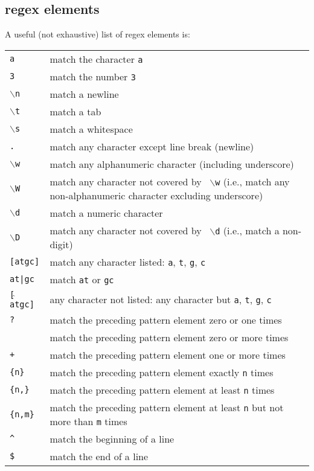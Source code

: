 \subsection {regex elements}

A useful (not exhaustive) list of regex elements is: 

\begin{tabular}{p{2cm} p{10cm}} 
 {\tt a} & match the character {\tt a}\\
 {\tt 3} & match the number {\tt 3}\\
 {\tt $\backslash$n} & match a newline\\
 {\tt $\backslash$t} & match a tab\\
 {\tt $\backslash$s} & match a whitespace\\
 {\tt .} & match any character except line break (newline)\\
 {\tt $\backslash$w} & match any alphanumeric character (including
underscore)\\
 {\tt $\backslash$W} & match any character not covered by {\tt 
 $\backslash$w} (i.e., match any non-alphanumeric character excluding 
 underscore)\\
 {\tt $\backslash$d} & match a numeric character\\
 {\tt $\backslash$D} & match any character not covered by {\tt 
 $\backslash$d} (i.e., match a non-digit)\\
 {\tt [atgc]} & match any character listed: {\tt a}, {\tt t}, {\tt g}, 
 {\tt c}\\
 {\tt at|gc} & match {\tt at} or {\tt gc}\\
 {\tt [$\hat{\,}$atgc]} & any character not listed: any character but 
 {\tt a}, {\tt t}, {\tt g}, {\tt c}\\
 {\tt ?} & match the preceding pattern element zero or one times\\
 {\tt *} & match the preceding pattern element zero or more times\\
 {\tt +} & match the preceding pattern element one or more times\\
 {\tt \{n\}} & match the preceding pattern element exactly {\tt n} times\\
 {\tt \{n,\}} & match the preceding pattern element at least {\tt n} times\\
 {\tt \{n,m\}} & match the preceding pattern element at least {\tt n}
but not more than {\tt m} times\\
 {\tt \textasciicircum} & match the beginning of a line\\
 {\tt \$} & match the end of a line\\
  \end{tabular}

